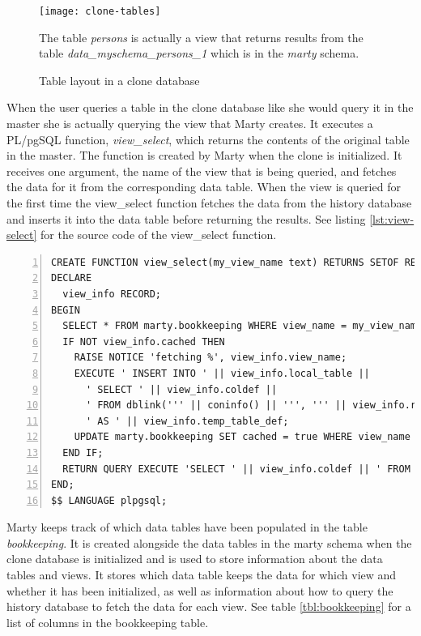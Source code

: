\begin{figure}[h!]
  \centering
    \texttt{[image: clone-tables]}
  \caption{Table layout in a clone database}
  \medskip
  \small
  The table \textit{persons} is actually a view that returns results from the table \textit{data\_myschema\_persons\_1} which is in the \textit{marty} schema.
  \label{fig:clone-tables-2}
\end{figure}

When the user queries a table in the clone database like she would query it in the master she is actually querying the view that Marty creates.
It executes a PL/pgSQL function, \textit{view\_select}, which returns the contents of the original table in the master.
The function is created by Marty when the clone is initialized.
It receives one argument, the name of the view that is being queried, and fetches the data for it from the corresponding data table.
When the view is queried for the first time the view\_select function fetches the data from the history database and inserts it into the data table before returning the results.
See listing \ref{lst:view-select} for the source code of the view\_select function.

\begin{lstlisting}[caption={The view\_select function},label={lst:view-select},numbers=left,xleftmargin=2em]
CREATE FUNCTION view_select(my_view_name text) RETURNS SETOF RECORD AS $$
DECLARE
  view_info RECORD;
BEGIN
  SELECT * FROM marty.bookkeeping WHERE view_name = my_view_name INTO view_info;
  IF NOT view_info.cached THEN
    RAISE NOTICE 'fetching %', view_info.view_name;
    EXECUTE ' INSERT INTO ' || view_info.local_table ||
      ' SELECT ' || view_info.coldef ||
      ' FROM dblink(''' || coninfo() || ''', ''' || view_info.remote_select_stmt || ''')'
      ' AS ' || view_info.temp_table_def;
	UPDATE marty.bookkeeping SET cached = true WHERE view_name = my_view_name;
  END IF;
  RETURN QUERY EXECUTE 'SELECT ' || view_info.coldef || ' FROM ' || view_info.local_table;
END;
$$ LANGUAGE plpgsql;
\end{lstlisting}

Marty keeps track of which data tables have been populated in the table \textit{bookkeeping}.
It is created alongside the data tables in the marty schema when the clone database is initialized and is used to store information about the data tables and views.
It stores which data table keeps the data for which view and whether it has been initialized, as well as information about how to query the history database to fetch the data for each view.
See table \ref{tbl:bookkeeping} for a list of columns in the bookkeeping table.

